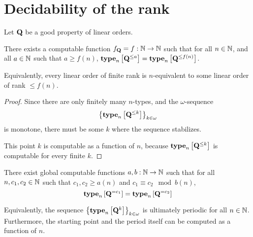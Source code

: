 \section{Decidability of the rank}

\begin{lemma}\label{f-lemma}
  Let $\mathbf{Q}$ be a good property of linear orders.

  There exists a computable function $f_{\mathbf{Q}} = f: \mathbb{N} \to \mathbb{N}$ such that
  for all $n \in \mathbb{N}$, and all $a \in \mathbb{N}$ such that $a \ge f(n)$,
  $\mathbf{type}_{n} \left[ {\mathbf{Q}^{\le a}} \right] = \mathbf{type}_{n} \left[ {\mathbf{Q}^{\le f(n)}} \right]$.

  Equivalently, every linear order of finite rank is $n$-equivalent to some linear order of rank $\le f(n)$.
\end{lemma}

\begin{proof}
  Since there are only finitely many $n$-types,
  and the $\omega$-sequence \[\left\{ {\mathbf{type}_{n} \left[ {\mathbf{Q}^{\le k}} \right]} \right\}_{k \in \omega}\]
  is monotone,
  there must be some $k$ where the sequence stabilizes.

  This point $k$ is computable as a function of $n$, because
  $\mathbf{type}_{n} \left[ {\mathbf{Q}^{\le k}} \right]$ is computable for every finite $k$.
\end{proof}

\begin{lemma}\label{ab-lemma}
  There exist global computable functions $a, b : \mathbb{N} \to \mathbb{N}$ such that
  for all $n, c_1, c_2 \in \mathbb{N}$ such that $c_1, c_2 \ge a(n)$ and $c_1 \equiv c_2 \mod b(n)$,
  \[\mathbf{type}_{n} \left[ {\mathbf{Q}^{= c_1}} \right] = \mathbf{type}_{n} \left[ {\mathbf{Q}^{= c_2}} \right]\]

  Equivalently, the sequence $\left\{ {\mathbf{type}_{n} \left[ {\mathbf{Q}^{k}} \right]} \right\}_{k \in \omega}$
  is ultimately periodic for all $n \in \mathbb{N}$. Furthermore, the starting point and the period
  itself can be computed as a function of $n$.
\end{lemma}

